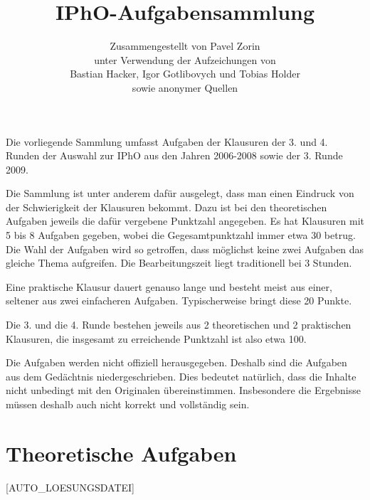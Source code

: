 \title{IPhO-Aufgabensammlung}
\author{Zusammengestellt von Pavel Zorin\\
unter Verwendung der Aufzeichungen von\\
Bastian Hacker, Igor Gotlibovych und Tobias Holder\\
sowie anonymer Quellen}


\maketitle

Die vorliegende Sammlung umfasst Aufgaben der Klausuren der 3. und 4. Runden der Auswahl zur IPhO aus den Jahren 2006-2008 sowie der 3. Runde 2009.

Die Sammlung ist unter anderem dafür ausgelegt, dass man einen Eindruck von der Schwierigkeit der Klausuren bekommt. Dazu ist bei den theoretischen Aufgaben jeweils die dafür vergebene Punktzahl angegeben. Es hat Klausuren mit 5 bis 8 Aufgaben gegeben, wobei die Gegesamtpunktzahl immer etwa 30 betrug. Die Wahl der Aufgaben wird so getroffen, dass möglichst keine zwei Aufgaben das gleiche Thema aufgreifen. Die Bearbeitungszeit liegt traditionell bei 3 Stunden.

Eine praktische Klausur dauert genauso lange und besteht meist aus einer, seltener aus zwei einfacheren Aufgaben. Typischerweise bringt diese 20 Punkte.

Die 3. und die 4. Runde bestehen jeweils aus 2 theoretischen und 2 praktischen Klausuren, die insgesamt zu erreichende Punktzahl ist also etwa 100.

Die Aufgaben werden nicht offiziell herausgegeben. Deshalb sind die Aufgaben aus dem Gedächtnis niedergeschrieben. Dies bedeutet natürlich, dass die Inhalte nicht unbedingt mit den Originalen übereinstimmen. Insbesondere die Ergebnisse müssen deshalb auch nicht korrekt und vollständig sein.

\section*{Theoretische Aufgaben}

[AUTO_LOESUNGSDATEI]


















